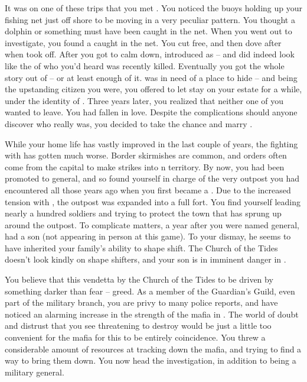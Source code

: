 \documentclass[char]{NeptuneBall}
\begin{document}
It was on one of these trips that you met \cQueen{}. You noticed the buoys holding up your fishing net just off shore to be moving in a very peculiar pattern. You thought a dolphin or something must have been caught in the net. When you went out to investigate, you found a \cQueen{\mer} caught in the net. You cut \cQueen{\them} free, and then dove after \cQueen{\them} when \cQueen{\they} took off. After you got \cQueen{\them} to calm down, \cQueen{\they} introduced \cQueen{\themself} as \cQueen{} -- and did indeed look like the \cQueen{\King} of \pAtlantis{} who you'd heard was recently killed. Eventually you got the whole story out of \cQueen{\them} -- or at least enough of it. \cQueen{} was in need of a place to hide -- and being the upstanding citizen you were, you offered to let \cQueen{\them} stay on your estate for a while, under the identity of \cQueen{\MYname}.  Three years later, you realized that neither one of you wanted \cQueen{\them} to leave. You had fallen in love. Despite the complications should anyone discover who \cQueen{} really was, you decided to take the chance and marry \cQueen{\them}.

While your home life has vastly improved in the last couple of years, the fighting with \pPacifica{} has gotten much worse. Border skirmishes are common, and orders often come from the capital to make strikes into \pPacifica{}n territory. By now, you had been promoted to general, and so found yourself in charge of the very outpost you had encountered all those years ago when you first became a \cGeneral{\mer}. Due to the increased tension with \pPacifica{}, the outpost was expanded into a full fort. You find yourself leading nearly a hundred soldiers and trying to protect the town that has sprung up around the outpost. To complicate matters, a year after you were named general, \cQueen{} had a son (not appearing in person at this game). To your dismay, he seems to have inherited your family's ability to shape shift. The Church of the Tides doesn't look kindly on shape shifters, and your son is in imminent danger in \pAtlantis{}.

You believe that this vendetta by the Church of the Tides to be driven by something darker than fear -- greed. As a member of the Guardian's Guild, even part of the military branch, you are privy to many police reports, and have noticed an alarming increase in the strength of the mafia in \pAtlantis{}. The world of doubt and distrust that you see threatening to destroy \pAtlantis{} would be just a little too convenient for the mafia for this to be entirely coincidence. You threw a considerable amount of resources at tracking down the mafia, and trying to find a way to bring them down. You now head the investigation, in addition to being a military general.
\end{document}
